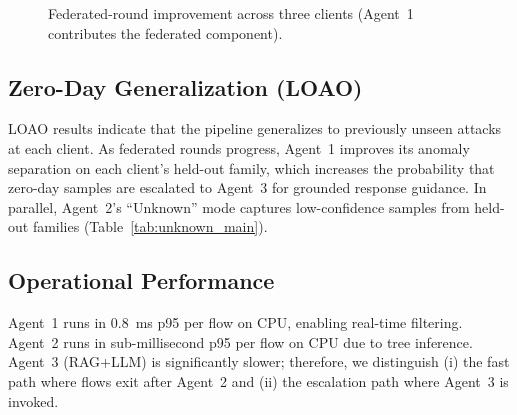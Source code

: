 \documentclass[conference]{IEEEtran}
\begin{document}
\begin{figure}[t]
\centering
{}
\caption{Federated-round improvement across three clients (Agent~1 contributes the federated component).}
\label{fig:fl_curve}
\end{figure}

\subsection{Zero-Day Generalization (LOAO)}
\label{sec:zeroday-narrative}

LOAO results indicate that the pipeline generalizes to previously unseen attacks at each client. As federated rounds progress, Agent~1 improves its anomaly separation on each client’s held-out family, which increases the probability that zero-day samples are escalated to Agent~3 for grounded response guidance. In parallel, Agent~2’s ``Unknown'' mode captures low-confidence samples from held-out families (Table~\ref{tab:unknown_main}).

\subsection{Operational Performance}
\label{sec:operational}

Agent~1 runs in \SI{0.8}{\milli\second} p95 per flow on CPU, enabling real-time filtering. Agent~2 runs in sub-millisecond p95 per flow on CPU due to tree inference. Agent~3 (RAG+LLM) is significantly slower; therefore, we distinguish (i) the fast path where flows exit after Agent~2 and (ii) the escalation path where Agent~3 is invoked.
\end{document}
